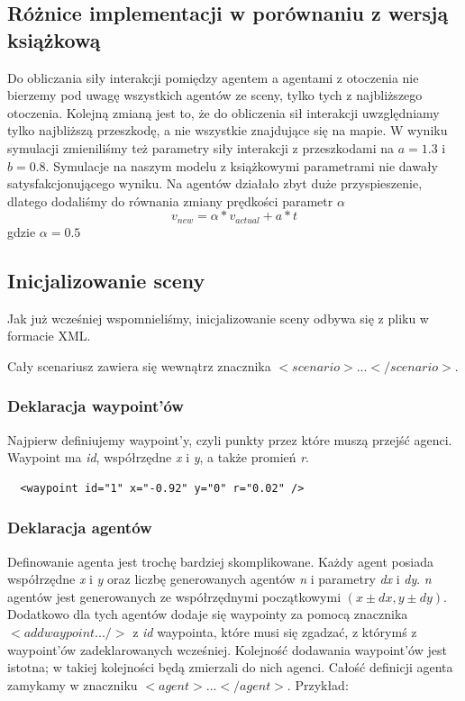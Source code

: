 \subsection{Różnice implementacji w porównaniu z wersją książkową}
\hspace{4ex}Do obliczania siły interakcji pomiędzy agentem a agentami z otoczenia nie bierzemy pod uwagę wszystkich agentów ze sceny, tylko tych z najbliższego otoczenia.
Kolejną zmianą jest to, że do obliczenia sił interakcji uwzględniamy tylko najbliższą przeszkodę, a nie wszystkie znajdujące się na mapie. W wyniku symulacji zmieniliśmy też parametry siły interakcji z przeszkodami na $a=1.3$ i $b=0.8$. Symulacje na naszym modelu z książkowymi parametrami nie dawały satysfakcjonującego wyniku. Na agentów działało zbyt duże przyspieszenie, dlatego dodaliśmy do równania zmiany prędkości parametr $\alpha$
$$v_{new} = \alpha * v_{actual} + a * t $$
gdzie $\alpha = 0.5$

\subsection{Inicjalizowanie sceny}
\hspace{4ex}Jak już wcześniej wspomnieliśmy, inicjalizowanie sceny odbywa się z pliku w formacie XML.

Cały scenariusz zawiera się wewnątrz znacznika $<scenario> ... </scenario>$.

\subsubsection{Deklaracja waypoint'ów}
\hspace{4ex}Najpierw definiujemy waypoint'y, czyli punkty przez które muszą przejść agenci. Waypoint ma \emph{id}, współrzędne \emph{x} i \emph{y}, a także promień \emph{r}.

\begin{lstlisting}
  <waypoint id="1" x="-0.92" y="0" r="0.02" />
\end{lstlisting}

\subsubsection{Deklaracja agentów}
\hspace{4ex}Definowanie agenta jest trochę bardziej skomplikowane. Każdy agent posiada współrzędne \emph{x} i \emph{y} oraz liczbę generowanych agentów \emph{n} i parametry \emph{dx} i \emph{dy}. \emph{n} agentów jest generowanych ze współrzędnymi początkowymi $(x \pm dx, y \pm dy)$. Dodatkowo dla tych agentów dodaje się waypointy za pomocą znacznika $<addwaypoint ... />$ z \emph{id} waypointa, które musi się zgadzać, z którymś z waypoint'ów zadeklarowanych wcześniej. Kolejność dodawania waypoint'ów jest istotna; w takiej kolejności będą zmierzali do nich agenci. Całość definicji agenta zamykamy w znaczniku $<agent> ... </agent>$. Przykład:

